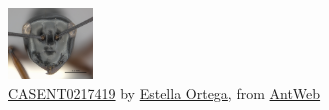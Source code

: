 \begin{figure}%
\centering%
\includegraphics[width=0.2\textwidth]{assets/images/CASENT0217419.jpg}%
\caption{\href{https://www.antweb.org/bigPicture.do?name=casent0217419&shot=h&number=1}{CASENT0217419} by \href{https://www.antweb.org/artist.do?id=92}{Estella Ortega}, from \href{https://www.antweb.org}{AntWeb}}%
\end{figure}